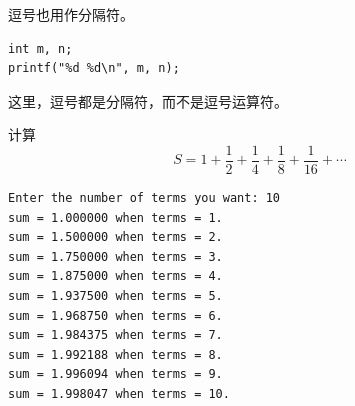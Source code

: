 \begin{frame}[fragile]\ft{\secname}
逗号也用作分隔符。
\begin{lstlisting}
int m, n;
printf("%d %d\n", m, n);
\end{lstlisting}
\pause\vspace{0.1in}

这里，逗号都是分隔符，而不是逗号运算符。
\end{frame}

\begin{frame}[fragile]\ft{\secname}
\begin{li}
计算
$$
S = 1 + \frac12 + \frac14 + \frac18 + \frac1{16} +\cdots 
$$
\end{li}
\end{frame}

\begin{frame}\ft{\secname}

\end{frame}

\begin{frame}[fragile]\ft{\secname}
 \begin{lstlisting}[backgroundcolor=\color{red!10}]
Enter the number of terms you want: 10
sum = 1.000000 when terms = 1.
sum = 1.500000 when terms = 2.
sum = 1.750000 when terms = 3.
sum = 1.875000 when terms = 4.
sum = 1.937500 when terms = 5.
sum = 1.968750 when terms = 6.
sum = 1.984375 when terms = 7.
sum = 1.992188 when terms = 8.
sum = 1.996094 when terms = 9.
sum = 1.998047 when terms = 10.
\end{lstlisting}
\end{frame}
